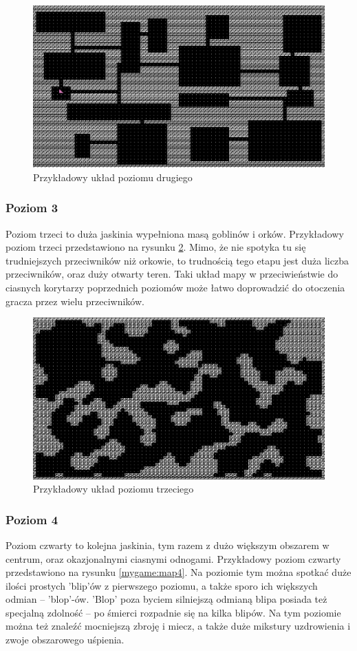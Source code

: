 \documentclass[12pt,twoside]{article}
\begin{document}
\FloatBarrier
\begin{figure}[h]
	\centering
	\includegraphics[width=12cm]{images/mygame/map2.png}
	\caption{Przykładowy układ poziomu drugiego}
	\label{mygame:map2}
\end{figure}
\FloatBarrier


\subsubsection{Poziom 3}
Poziom trzeci to duża jaskinia wypełniona masą goblinów i orków. Przykładowy poziom trzeci przedstawiono na rysunku \ref{mygame:map3}. Mimo, że nie spotyka tu się trudniejszych przeciwników niż orkowie, to trudnością tego etapu jest duża liczba przeciwników, oraz duży otwarty teren. Taki układ mapy w przeciwieństwie do ciasnych korytarzy poprzednich poziomów może łatwo doprowadzić do otoczenia gracza przez wielu przeciwników.

\FloatBarrier
\begin{figure}[h]
	\centering
	\includegraphics[width=12cm]{images/mygame/map3.png}
	\caption{Przykładowy układ poziomu trzeciego}
	\label{mygame:map3}
\end{figure}
\FloatBarrier


\subsubsection{Poziom 4}
Poziom czwarty to kolejna jaskinia, tym razem z dużo większym obszarem w centrum, oraz okazjonalnymi ciasnymi odnogami. Przykładowy poziom czwarty przedstawiono na rysunku \ref{mygame:map4}. Na poziomie tym można spotkać duże ilości prostych 'blip'ów z pierwszego poziomu, a także sporo ich większych odmian -- 'blop'-ów. 'Blop' poza byciem silniejszą odmianą blipa posiada też specjalną zdolność -- po śmierci rozpadnie się na kilka blipów. Na tym poziomie można też znaleźć mocniejszą zbroję i miecz, a także duże mikstury uzdrowienia i zwoje obszarowego uśpienia.
\end{document}
